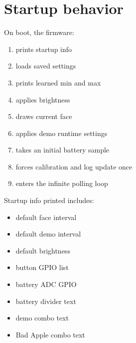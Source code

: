 \documentclass[11pt]{article}
\begin{document}
\section{Startup behavior}
On boot, the firmware:
\begin{enumerate}
  \item prints startup info
  \item loads saved settings
  \item prints learned min and max
  \item applies brightness
  \item draws current face
  \item applies demo runtime settings
  \item takes an initial battery sample
  \item forces calibration and log update once
  \item enters the infinite polling loop
\end{enumerate}

Startup info printed includes:
\begin{itemize}
  \item default face interval
  \item default demo interval
  \item default brightness
  \item button GPIO list
  \item battery ADC GPIO
  \item battery divider text
  \item demo combo text
  \item Bad Apple combo text
\end{itemize}
\end{document}
